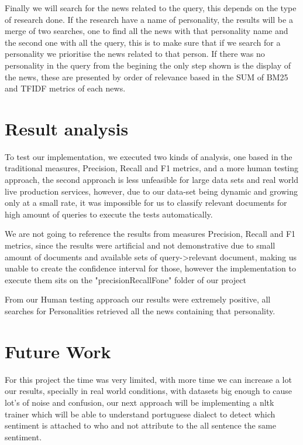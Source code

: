 \documentclass{acm_proc_article-sp}
\begin{document}
Finally we will search for the news related to the query, this depends on the type of research done. If the research have a name of personality, the results will be a merge of two searches, one to find all the news with that personality name and the second one with all the query, this is to make sure that if we search for a personality we prioritise the news related to that person. If there was no personality in the query from the begining the only step shown is the display of the news, these are presented by order of relevance based in the SUM of BM25 and TFIDF metrics of each news. 



\section{Result analysis}
To test our implementation, we executed two kinds of analysis, one based in the traditional measures, Precision, Recall and F1 metrics, and a more human testing approach, the second approach is less unfeasible for large data sets and real world live production services, however, due to our data-set being dynamic and growing only at a small rate, it was impossible for us to classify relevant documents for high amount of queries to execute the tests automatically.

We are not going to reference the results from measures Precision, Recall and F1 metrics, since the results were artificial and not demonstrative due to small amount of documents and available sets of query->relevant document, making us unable to create the confidence interval for those, however the implementation to execute them sits on the "precisionRecallFone" folder of our project

From our Human testing approach our results were extremely positive, all searches for Personalities retrieved all the news containing that personality.

\section{Future Work}
For this project the time was very limited, with more time we can increase a lot our results, specially in real world conditions, with datasets big enough to cause lot's of noise and confusion, our next approach will be implementing a nltk trainer which will be able to understand portuguese dialect to detect which sentiment is attached to who and not attribute to the all sentence the same sentiment.
\end{document}
